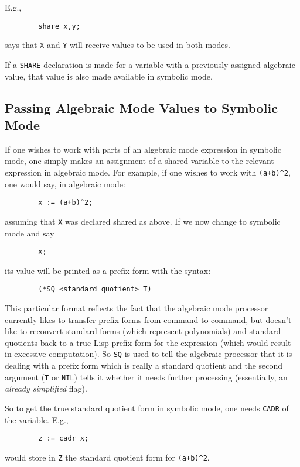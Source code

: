 E.g.,
\begin{verbatim}
        share x,y;
\end{verbatim}
says that {\tt X} and {\tt Y} will receive values to be used in both modes.

If a {\tt SHARE} declaration is made for a variable with a previously
assigned algebraic value, that value is also made available in symbolic
mode.

\subsection{Passing Algebraic Mode Values to Symbolic Mode}

If one wishes to work with parts of an algebraic mode
 expression in symbolic mode,
one simply makes an assignment of a shared variable to
the relevant expression in algebraic mode.  For example, if one wishes to
work with {\tt (a+b)\verb|^|2}, one would say, in algebraic mode:
\begin{verbatim}
        x := (a+b)^2;
\end{verbatim}
assuming that {\tt X} was declared shared as above.  If we now change to
symbolic mode and say
\begin{verbatim}
        x;
\end{verbatim}
its value will be printed as a prefix form with the syntax:
\begin{verbatim}
        (*SQ <standard quotient> T)
\end{verbatim}
This particular format reflects the fact that the algebraic mode processor
currently likes to transfer prefix forms from command to command, but
doesn't like to reconvert standard forms (which
represent polynomials) and standard quotients back to a true Lisp prefix
form for the expression (which would result in excessive computation).  So
{\tt *SQ} is used to tell the algebraic processor that it is dealing with
a prefix form which is really a standard quotient and the second argument ({\tt T} or {\tt NIL}) tells it whether
it needs further processing (essentially, an {\em already simplified\/}
flag).

So to get the true standard quotient form in symbolic mode, one needs
{\tt CADR} of the variable. E.g.,
\begin{verbatim}
        z := cadr x;
\end{verbatim}
would store in {\tt Z} the standard quotient form for {\tt (a+b)\verb|^|2}.

